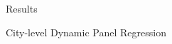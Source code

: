 \documentclass{beamer}
\begin{document}
\begin{section}{Results}
  \begin{frame}{City-level Dynamic Panel Regression}

\end{frame}
\end{section}
\end{document}
